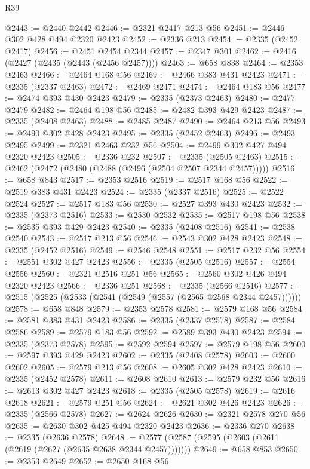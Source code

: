 \begin{lexlean}{R39}
\begin{coremodule}
@2443 := @2440 @2442
@2446 := @2321 @2417 @213 @56
@2451 := @2446 @302 @428 @494 @2320 @2423
@2452 := @2336 @213
@2454 := @2335 (@2452 @2417)
@2456 := @2451 @2454 @2344
@2457 := @2347 @301
@2462 := @2416 (@2427 (@2435 (@2443 (@2456 @2457))))
@2463 := @658 @838
@2464 := @2353 @2463
@2466 := @2464 @168 @56
@2469 := @2466 @383 @431 @2423
@2471 := @2335 (@2337 @2463)
@2472 := @2469 @2471
@2474 := @2464 @183 @56
@2477 := @2474 @393 @430 @2423
@2479 := @2335 (@2373 @2463)
@2480 := @2477 @2479
@2482 := @2464 @198 @56
@2485 := @2482 @393 @429 @2423
@2487 := @2335 (@2408 @2463)
@2488 := @2485 @2487
@2490 := @2464 @213 @56
@2493 := @2490 @302 @428 @2423
@2495 := @2335 (@2452 @2463)
@2496 := @2493 @2495
@2499 := @2321 @2463 @232 @56
@2504 := @2499 @302 @427 @494 @2320 @2423
@2505 := @2336 @232
@2507 := @2335 (@2505 @2463)
@2515 := @2462 (@2472 (@2480 (@2488 (@2496 (@2504 @2507 @2344 @2457)))))
@2516 := @658 @843
@2517 := @2353 @2516
@2519 := @2517 @168 @56
@2522 := @2519 @383 @431 @2423
@2524 := @2335 (@2337 @2516)
@2525 := @2522 @2524
@2527 := @2517 @183 @56
@2530 := @2527 @393 @430 @2423
@2532 := @2335 (@2373 @2516)
@2533 := @2530 @2532
@2535 := @2517 @198 @56
@2538 := @2535 @393 @429 @2423
@2540 := @2335 (@2408 @2516)
@2541 := @2538 @2540
@2543 := @2517 @213 @56
@2546 := @2543 @302 @428 @2423
@2548 := @2335 (@2452 @2516)
@2549 := @2546 @2548
@2551 := @2517 @232 @56
@2554 := @2551 @302 @427 @2423
@2556 := @2335 (@2505 @2516)
@2557 := @2554 @2556
@2560 := @2321 @2516 @251 @56
@2565 := @2560 @302 @426 @494 @2320 @2423
@2566 := @2336 @251
@2568 := @2335 (@2566 @2516)
@2577 := @2515 (@2525 (@2533 (@2541 (@2549 (@2557 (@2565 @2568 @2344 @2457))))))
@2578 := @658 @848
@2579 := @2353 @2578
@2581 := @2579 @168 @56
@2584 := @2581 @383 @431 @2423
@2586 := @2335 (@2337 @2578)
@2587 := @2584 @2586
@2589 := @2579 @183 @56
@2592 := @2589 @393 @430 @2423
@2594 := @2335 (@2373 @2578)
@2595 := @2592 @2594
@2597 := @2579 @198 @56
@2600 := @2597 @393 @429 @2423
@2602 := @2335 (@2408 @2578)
@2603 := @2600 @2602
@2605 := @2579 @213 @56
@2608 := @2605 @302 @428 @2423
@2610 := @2335 (@2452 @2578)
@2611 := @2608 @2610
@2613 := @2579 @232 @56
@2616 := @2613 @302 @427 @2423
@2618 := @2335 (@2505 @2578)
@2619 := @2616 @2618
@2621 := @2579 @251 @56
@2624 := @2621 @302 @426 @2423
@2626 := @2335 (@2566 @2578)
@2627 := @2624 @2626
@2630 := @2321 @2578 @270 @56
@2635 := @2630 @302 @425 @494 @2320 @2423
@2636 := @2336 @270
@2638 := @2335 (@2636 @2578)
@2648 := @2577 (@2587 (@2595 (@2603 (@2611 (@2619 (@2627 (@2635 @2638 @2344 @2457)))))))
@2649 := @658 @853
@2650 := @2353 @2649
@2652 := @2650 @168 @56

\end{coremodule}
\end{lexlean}

